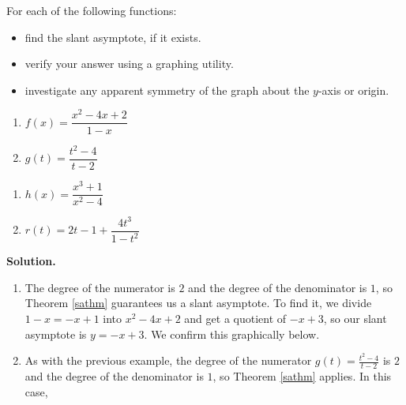 \begin{ex} \label{saexample}  For each of the following functions:

\begin{itemize}

\item find the slant asymptote, if it exists.

\item  verify your answer using a graphing utility.

\item  investigate any apparent symmetry of the graph about the $y$-axis or origin.

\end{itemize}


\begin{multicols}{2}
\begin{enumerate}

\item  $f(x) = \dfrac{x^2-4x+2}{1-x}$  

\item  \label{sacancel} $g(t) = \dfrac{t^2-4}{t-2}$

\setcounter{HW}{\value{enumi}}
\end{enumerate}
\end{multicols}

\begin{multicols}{2}
\begin{enumerate}
\setcounter{enumi}{\value{HW}}


\item  $h(x) = \dfrac{x^3+1}{x^2-4}$

\item  $r(t) = 2t-1+\dfrac{4t^3}{1-t^2}$ 

\setcounter{HW}{\value{enumi}}
\end{enumerate}
\end{multicols}



{\bf Solution.}

\begin{enumerate}

\item  The degree of the numerator is $2$ and the degree of the denominator is $1$, so Theorem \ref{sathm} guarantees us a slant asymptote.  To find it, we divide $1-x = -x+1$ into $x^2-4x+2$ and get a quotient of $-x+3$, so our slant asymptote is $y=-x+3$.  We confirm this graphically below.

\item  As with the previous example, the degree of the numerator $g(t) = \frac{t^2-4}{t-2}$ is $2$ and the degree of the denominator is $1$, so Theorem \ref{sathm} applies.  In this case, 


\end{enumerate}
\end{ex}
